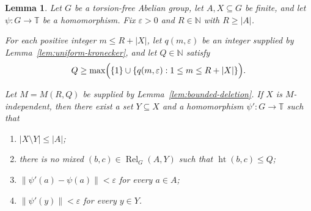 \documentclass[11pt]{amsart}
\newtheorem{lemma}[theorem]{Lemma}
\theoremstyle{definition}
\newcommand{\T}{\mathbb T}
\newcommand{\N}{\mathbb N}
\newcommand{\Rel}{\operatorname{Rel}}
\newcommand{\htop}{\operatorname{ht}}
\begin{document}
\begin{lemma}\label{lem:fusion-step}
Let $G$ be a torsion-free Abelian group, let $A,X\subseteq G$ be finite, and
let $\psi:G\to\T$ be a homomorphism. Fix $\varepsilon>0$ and
$R\in\N$ with $R\geq |A|$.

For each positive integer $m\leq R+|X|$, let $q(m,\varepsilon)$ be an
integer supplied by Lemma~\ref{lem:uniform-kronecker}, and let $Q\in\N$
satisfy
\[
Q\geq
\max\Bigl(
 \{1\}\cup
 \{q(m,\varepsilon):1\leq m\leq R+|X|\}
\Bigr).
\]

Let $M=M(R,Q)$ be supplied by Lemma~\ref{lem:bounded-deletion}. If $X$ is
$M$-independent, then there exist a set $Y\subseteq X$ and a
homomorphism $\psi':G\to\T$ such that
\begin{enumerate}
\item\label{item:fusion-delete}
$|X\setminus Y|\leq |A|$;

\item\label{item:fusion-no-mixed}
there is no mixed $(b,c)\in\Rel_G(A,Y)$ such that $\htop(b,c)\leq Q$;

\item\label{item:fusion-old}
$\|\psi'(a)-\psi(a)\|<\varepsilon$ for every $a\in A$;

\item\label{item:fusion-new}
$\|\psi'(y)\|<\varepsilon$ for every $y\in Y$.
\end{enumerate}
\end{lemma}
\end{document}
